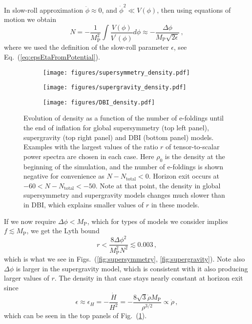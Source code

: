 \documentclass[12pt]{article}
\begin{document}
In slow-roll approximation $\ddot \phi \approx 0$, and ${\dot \phi}^2 \ll V\left(\phi\right)$, then using equations of motion we obtain
\begin{equation} \label{eq:efoldingsCanonical}
  N = - \frac{1}{M_\text{P}^2} \int \frac{V\left(\phi\right)}{V^\prime\left(\phi\right)} d\phi
    \approx - \frac{\Delta \phi}{M_\text{P} \sqrt{2 \epsilon}}\,,
\end{equation}
where we used the definition of the slow-roll parameter $\epsilon$, see Eq.~(\ref{eq:epsEtaFromPotential}).

\begin{figure}
  \centering
  \begin{subfigure}{0.45 \textwidth}
    \texttt{[image: figures/supersymmetry\_density.pdf]}
  \end{subfigure}
  \begin{subfigure}{0.45 \textwidth}
    \texttt{[image: figures/supergravity\_density.pdf]}
  \end{subfigure}
  \begin{subfigure}{0.45 \textwidth}
    \texttt{[image: figures/DBI\_density.pdf]}
  \end{subfigure}
  \caption{
    Evolution of density as a function of the number of e-foldings until the end of inflation for global supersymmetry (top left panel), supergravity (top right panel) and DBI (bottom panel) models.
    Examples with the largest values of the ratio $r$ of tensor-to-scalar power spectra are chosen in each case.
    Here $\rho_0$ is the density at the beginning of the simulation, and the number of e-foldings is shown negative for convenience as $N - N_\text{total} < 0$.
    Horizon exit occurs at $-60 < N - N_\text{total} < -50$.
    Note at that point, the density in global supersymmetry and supergravity models changes much slower than in DBI, which explains smaller values of $r$ in these models.
  } \label{fig:density}
\end{figure}

If we now require $\Delta \phi < M_\text{P}$, which for types of models we consider implies $f \lesssim M_\text{P}$, we get the Lyth bound~\cite{Lyth:1996im}
\begin{equation}
  r < \frac{8 \Delta \phi^2}{M_\text{P}^2 N^2} \lesssim 0.003\,,
\end{equation}
which is what we see in Figs.~(\ref{fig:supersymmetry}, \ref{fig:supergravity}).
Note also $\Delta\phi$ is larger in the supergravity model, which is consistent with it also producing larger values of $r$.
The density in that case stays nearly constant at horizon exit since
\begin{equation}
  \epsilon \approx \epsilon_H
           = - \frac{\dot H}{H^2}
           = - \frac{8 \sqrt{3} \dot\rho M_\text{P}}{\rho^{3 / 2}}
           \propto \dot\rho\,,
\end{equation}
which can be seen in the top panels of Fig.~(\ref{fig:density}).
\end{document}

